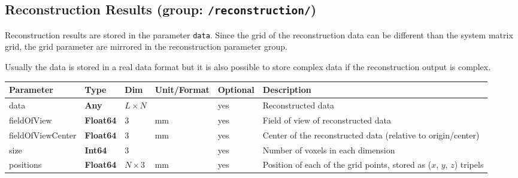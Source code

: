 \documentclass[landscape]{article} %
\newcommand{\inl}[1]{\lstinline[columns=fixed]{#1}}
\newcommand{\inltab}[1]{{\ttfamily\bfseries\color{blue}#1}}
\newcommand{\inlvar}[1]{{\ttfamily#1}}
\begin{document}
\subsection{Reconstruction Results (group: \inl{/reconstruction/})}

\begin{multicols}{2}

Reconstruction results are stored in the parameter \inl{data}. Since the grid of the reconstruction data can be different than the system matrix grid, the grid parameter are mirrored in the reconstruction parameter group. 

Usually the data is stored in a real data format but it is also possible to store complex data if the reconstruction output is complex.\newline

\end{multicols}

\noindent \begin{tabularx}{\columnwidth}{lllllX} 
\textbf{Parameter} & \textbf{Type} & \textbf{Dim} & \textbf{Unit/Format} & \textbf{Optional} & \textbf{Description} \\ \hline 
\inlvar{data} & \inltab{Any} & $L\times N$ & & yes & Reconstructed data \\ \hline
\inlvar{fieldOfView} & \inltab{Float64} & $3$ & mm & yes & Field of view of reconstructed data \\ \hline
\inlvar{fieldOfViewCenter} & \inltab{Float64} & $3$ & mm & yes & Center of the reconstructed data (relative to origin/center) \\ \hline 
\inlvar{size} & \inltab{Int64} & $3$ &  & yes & Number of voxels in each dimension \\ \hline
\inlvar{positions} & \inltab{Float64} & $N \times 3$ & mm & yes & Position of each of the grid points, stored as ($x$, $y$, $z$) tripels \\ \hline
\end{tabularx}

%

%
\end{document}

